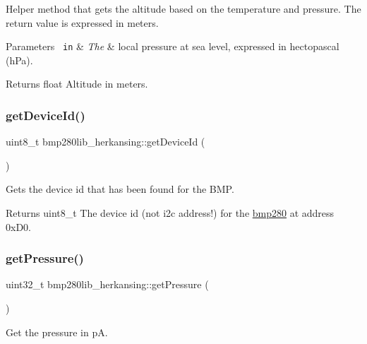 Helper method that gets the altitude based on the temperature and pressure. The return value is expressed in meters. 


\begin{DoxyParams}[1]{Parameters}
\mbox{\texttt{ in}}  & {\em The} & local pressure at sea level, expressed in hectopascal (h\+Pa). \\
\hline
\end{DoxyParams}
\begin{DoxyReturn}{Returns}
float Altitude in meters. 
\end{DoxyReturn}
\mbox{\label{classbmp280lib__herkansing_aef18583b72fd106287ab46f37a4d293c}} 
\subsubsection{\texorpdfstring{getDeviceId()}{getDeviceId()}}
{\footnotesize\ttfamily uint8\+\_\+t bmp280lib\+\_\+herkansing\+::get\+Device\+Id (\begin{DoxyParamCaption}{ }\end{DoxyParamCaption})}



Gets the device id that has been found for the B\+MP. 

\begin{DoxyReturn}{Returns}
uint8\+\_\+t The device id (not i2c address!) for the \mbox{\hyperlink{classbmp280}{bmp280}} at address 0x\+D0. 
\end{DoxyReturn}
\mbox{\label{classbmp280lib__herkansing_a89c716a3a52660f3d54f13dca2436211}} 
\subsubsection{\texorpdfstring{getPressure()}{getPressure()}}
{\footnotesize\ttfamily uint32\+\_\+t bmp280lib\+\_\+herkansing\+::get\+Pressure (\begin{DoxyParamCaption}{ }\end{DoxyParamCaption})}



Get the pressure in pA. 

